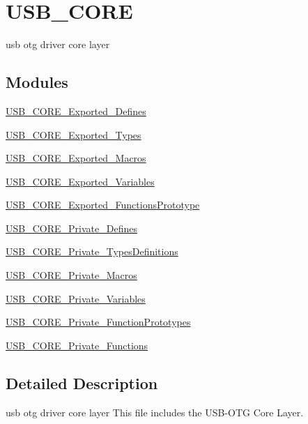 \hypertarget{group___u_s_b___c_o_r_e}{\section{U\-S\-B\-\_\-\-C\-O\-R\-E}
\label{group___u_s_b___c_o_r_e}
}


usb otg driver core layer  


\subsection*{Modules}
\begin{DoxyCompactItemize}
\item 
\hyperlink{group___u_s_b___c_o_r_e___exported___defines}{U\-S\-B\-\_\-\-C\-O\-R\-E\-\_\-\-Exported\-\_\-\-Defines}
\item 
\hyperlink{group___u_s_b___c_o_r_e___exported___types}{U\-S\-B\-\_\-\-C\-O\-R\-E\-\_\-\-Exported\-\_\-\-Types}
\item 
\hyperlink{group___u_s_b___c_o_r_e___exported___macros}{U\-S\-B\-\_\-\-C\-O\-R\-E\-\_\-\-Exported\-\_\-\-Macros}
\item 
\hyperlink{group___u_s_b___c_o_r_e___exported___variables}{U\-S\-B\-\_\-\-C\-O\-R\-E\-\_\-\-Exported\-\_\-\-Variables}
\item 
\hyperlink{group___u_s_b___c_o_r_e___exported___functions_prototype}{U\-S\-B\-\_\-\-C\-O\-R\-E\-\_\-\-Exported\-\_\-\-Functions\-Prototype}
\item 
\hyperlink{group___u_s_b___c_o_r_e___private___defines}{U\-S\-B\-\_\-\-C\-O\-R\-E\-\_\-\-Private\-\_\-\-Defines}
\item 
\hyperlink{group___u_s_b___c_o_r_e___private___types_definitions}{U\-S\-B\-\_\-\-C\-O\-R\-E\-\_\-\-Private\-\_\-\-Types\-Definitions}
\item 
\hyperlink{group___u_s_b___c_o_r_e___private___macros}{U\-S\-B\-\_\-\-C\-O\-R\-E\-\_\-\-Private\-\_\-\-Macros}
\item 
\hyperlink{group___u_s_b___c_o_r_e___private___variables}{U\-S\-B\-\_\-\-C\-O\-R\-E\-\_\-\-Private\-\_\-\-Variables}
\item 
\hyperlink{group___u_s_b___c_o_r_e___private___function_prototypes}{U\-S\-B\-\_\-\-C\-O\-R\-E\-\_\-\-Private\-\_\-\-Function\-Prototypes}
\item 
\hyperlink{group___u_s_b___c_o_r_e___private___functions}{U\-S\-B\-\_\-\-C\-O\-R\-E\-\_\-\-Private\-\_\-\-Functions}
\end{DoxyCompactItemize}


\subsection{Detailed Description}
usb otg driver core layer This file includes the U\-S\-B-\/\-O\-T\-G Core Layer.